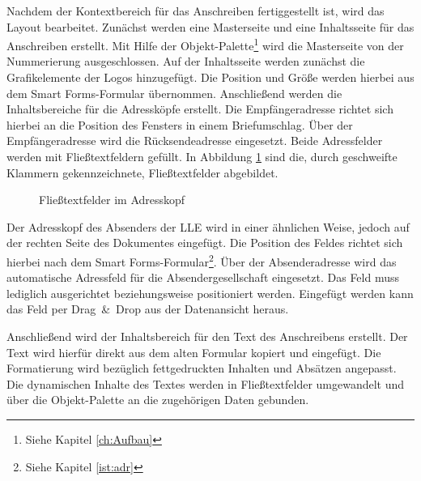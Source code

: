 Nachdem der Kontextbereich für das Anschreiben fertiggestellt ist, wird das Layout bearbeitet. Zunächst werden eine Masterseite und eine Inhaltsseite für das Anschreiben erstellt. Mit Hilfe der Objekt-Palette\footnote{Siehe Kapitel \ref{ch:Aufbau}} wird die Masterseite von der Nummerierung ausgeschlossen. Auf der Inhaltsseite werden zunächst die Grafikelemente der Logos hinzugefügt. Die Position und Größe werden hierbei aus dem Smart Forms-Formular übernommen. Anschließend werden die Inhaltsbereiche für die Adressköpfe erstellt. Die Empfängeradresse richtet sich hierbei an die Position des Fensters in einem Briefumschlag. Über der Empfängeradresse wird die Rücksendeadresse eingesetzt. Beide Adressfelder werden mit Fließtextfeldern gefüllt. In Abbildung \ref{if:adr} sind die, durch geschweifte Klammern gekennzeichnete, Fließtextfelder abgebildet.

 \begin{figure}[ht]
	\centering
	\caption{Fließtextfelder im Adresskopf}
	\label{if:adr}
\end{figure}

Der Adresskopf des Absenders der \ac{LLE} wird in einer ähnlichen Weise, jedoch auf der rechten Seite des Dokumentes eingefügt. Die Position des Feldes richtet sich hierbei nach dem Smart Forms-Formular\footnote{Siehe Kapitel \ref{ist:adr}}. Über der Absenderadresse wird das automatische Adressfeld für die Absendergesellschaft eingesetzt. Das Feld muss lediglich ausgerichtet beziehungsweise positioniert werden.  Eingefügt werden kann das Feld per Drag~\&~Drop aus der Datenansicht heraus.

Anschließend wird der Inhaltsbereich für den Text des Anschreibens erstellt. Der Text wird hierfür direkt aus dem alten Formular kopiert und eingefügt. Die Formatierung wird bezüglich fettgedruckten Inhalten und Absätzen angepasst. Die dynamischen Inhalte des Textes werden in Fließtextfelder umgewandelt und über die Objekt-Palette an die zugehörigen Daten gebunden.


